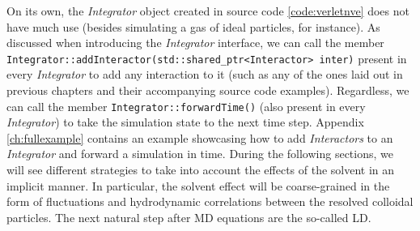\documentclass[ twoside,openright,titlepage,numbers=noenddot,%
headinclude,footinclude,cleardoublepage=empty,abstract=on,
BCOR=5mm,paper=b5,fontsize=11pt, dvipsnames
]{scrreprt}
\def\ucpp{uammd_cpp_lexer.py:UAMMDCppLexer -x}
\begin{document}
On its own, the \emph{Integrator} object created in source code \ref{code:verletnve} does not have much use (besides simulating a gas of ideal particles, for instance). As discussed when introducing the \emph{Integrator} interface, we can call the member \texttt{Integrator::addInteractor(std::shared_ptr<Interactor> inter)} present in every \emph{Integrator} to add any interaction to it (such as any of the ones laid out in previous chapters and their accompanying source code examples). Regardless, we can call the member \texttt{Integrator::forwardTime()} (also present in every \emph{Integrator}) to take the simulation state to the next time step. Appendix \ref{ch:fullexample} contains an example showcasing how to add \emph{Interactors} to an \emph{Integrator} and forward a simulation in time.
%
During the following sections, we will see different strategies to take into account the effects of the solvent in an implicit manner. In particular, the solvent effect will be coarse-grained in the form of fluctuations and hydrodynamic correlations between the resolved colloidal particles.
The next natural step after \gls{MD} equations are the so-called \gls{LD}.
\end{document}
